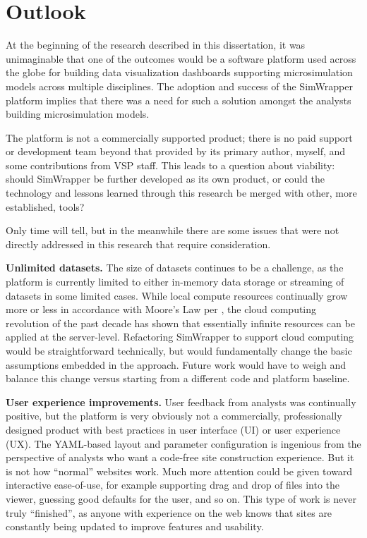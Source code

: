 \section{Outlook}
\label{08-conclusions-outlook}

At the beginning of the research described in this dissertation, it was unimaginable that one of the outcomes would be a software platform used across the globe for building data visualization dashboards supporting microsimulation models across multiple disciplines. The adoption and success of the SimWrapper platform implies that there was a need for such a solution amongst the analysts building microsimulation models.

The platform is not a commercially supported product; there is no paid support or development team beyond that provided by its primary author, myself, and some contributions from VSP staff. This leads to a question about viability: should SimWrapper be further developed as its own product, or could the technology and lessons learned through this research be merged with other, more established, tools?

Only time will tell, but in the meanwhile there are some issues that were not directly addressed in this research that require consideration.

\textbf{Unlimited datasets.} The size of datasets continues to be a challenge, as the platform is currently limited to either in-memory data storage or streaming of datasets in some limited cases. While local compute resources continually grow more or less in accordance with Moore's Law per \cite{Schaller1997MooresLaw}, the cloud computing revolution of the past decade has shown that essentially infinite resources can be applied at the server-level. Refactoring SimWrapper to support cloud computing would be straightforward technically, but would fundamentally change the basic assumptions embedded in the approach. Future work would have to weigh and balance this change versus starting from a different code and platform baseline.

\textbf{User experience improvements.} User feedback from analysts was continually positive, but the platform is very obviously not a commercially, professionally designed product with best practices in user interface (UI) or user experience (UX). The YAML-based layout and parameter configuration is ingenious from the perspective of analysts who want a code-free site construction experience. But it is not how ``normal'' websites work. Much more attention could be given toward interactive ease-of-use, for example supporting drag and drop of files into the viewer, guessing good defaults for the user, and so on. This type of work is never truly ``finished'', as anyone with experience on the web knows that sites are constantly being updated to improve features and usability.

